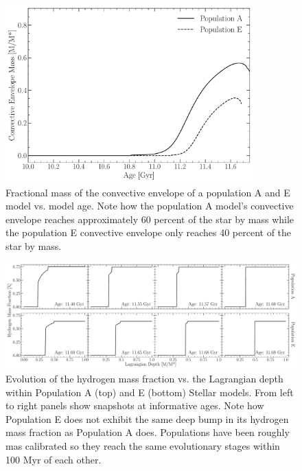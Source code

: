 \begin{figure}
  \centering
  \includegraphics[width=0.85\textwidth]{figures/rgbb/ConvectiveEnvelopeMass.pdf}
  \caption{Fractional mass of the convective envelope of a population A and E
  model vs. model age. Note how the population A model's convective envelope
  reaches approximately 60 percent of the star by mass while the population E
  convective envelope only reaches 40 percent of the star by mass.}
  \label{fig:convEnvMass}
\end{figure}

\begin{figure}
    \centering
    \includegraphics[width=\textwidth]{figures/rgbb/EvolutionAE.pdf}
    \caption{Evolution of the hydrogen mass fraction vs. the Lagrangian depth
    within Population A (top) and E (bottom) Stellar models. From left to right
    panels show snapshots at informative ages. Note how Population E does not
    exhibit the same deep bump in its hydrogen mass fraction as Population A
    does. Populations have been roughly mas calibrated so they reach the same
    evolutionary stages within 100 Myr of each other.}
    \label{fig:MfracVX}
\end{figure}
